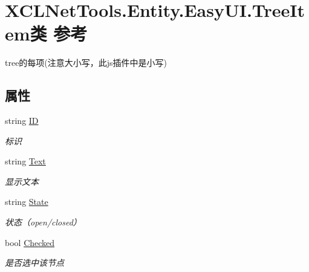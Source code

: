 \hypertarget{class_x_c_l_net_tools_1_1_entity_1_1_easy_u_i_1_1_tree_item}{}\section{X\+C\+L\+Net\+Tools.\+Entity.\+Easy\+U\+I.\+Tree\+Item类 参考}
\label{class_x_c_l_net_tools_1_1_entity_1_1_easy_u_i_1_1_tree_item}


tree的每项(注意大小写，此js插件中是小写)  


\subsection*{属性}
\begin{DoxyCompactItemize}
\item 
string \hyperlink{class_x_c_l_net_tools_1_1_entity_1_1_easy_u_i_1_1_tree_item_a93f2c5a6d4b3e1af4bd5c3e3fd4192f6}{ID}
\begin{DoxyCompactList}\small\item\em 标识 \end{DoxyCompactList}\item 
string \hyperlink{class_x_c_l_net_tools_1_1_entity_1_1_easy_u_i_1_1_tree_item_ad85e722c4909d6b93ea2e80e7014ed0c}{Text}
\begin{DoxyCompactList}\small\item\em 显示文本 \end{DoxyCompactList}\item 
string \hyperlink{class_x_c_l_net_tools_1_1_entity_1_1_easy_u_i_1_1_tree_item_a79ad03a5903f54fdd4d60a3206105def}{State}
\begin{DoxyCompactList}\small\item\em 状态（open/closed） \end{DoxyCompactList}\item 
bool \hyperlink{class_x_c_l_net_tools_1_1_entity_1_1_easy_u_i_1_1_tree_item_a2d4233734dd33a74b5339392b38d5ed0}{Checked}
\begin{DoxyCompactList}\small\item\em 是否选中该节点 \end{DoxyCompactList}\item 

\end{DoxyCompactItemize}
